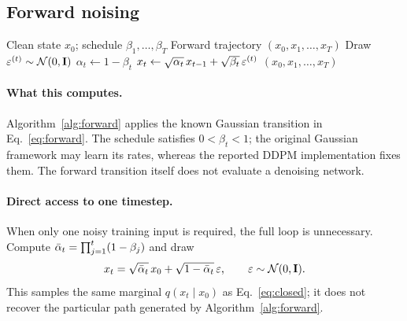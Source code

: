 \pagecut
\nobalance
{}

\subsection{Forward noising}
\begin{algorithm}[H]
\caption{Forward Gaussian diffusion}\label{alg:forward}
\small
\begin{algorithmic}[1]
\Require Clean state $x_0$; schedule $\beta_1,\ldots,\beta_T$
\Ensure Forward trajectory $(x_0,x_1,\ldots,x_T)$
  \State Draw $\varepsilon^{(t)}\sim\mathcal{N}(0,\mathbf{I})$
  \State $\alpha_t\gets 1-\beta_t$
  \State $x_t\gets\sqrt{\alpha_t}\,x_{t-1}
                   +\sqrt{\beta_t}\,\varepsilon^{(t)}$
\EndFor
\State \Return $(x_0,x_1,\ldots,x_T)$
\end{algorithmic}
\end{algorithm}

\paragraph{What this computes.}
Algorithm~\ref{alg:forward} applies the known Gaussian transition
in Eq.~\eqref{eq:forward}. The schedule satisfies $0<\beta_t<1$;
the original Gaussian framework may learn its rates, whereas the
reported DDPM implementation fixes them. The forward transition
itself does not evaluate a denoising network.

\paragraph{Direct access to one timestep.}
When only one noisy training input is required, the full loop is
unnecessary. Compute $\bar{\alpha}_t=\prod_{j=1}^{t}(1-\beta_j)$ and draw
\begin{equation*}
x_t=\sqrt{\bar{\alpha}_t}\,x_0+\sqrt{1-\bar{\alpha}_t}\,\varepsilon,
\qquad\varepsilon\sim\mathcal{N}(0,\mathbf{I}).
\end{equation*}
This samples the same marginal $q(x_t\mid x_0)$ as
Eq.~\eqref{eq:closed}; it does not recover the particular path generated
by Algorithm~\ref{alg:forward}.

